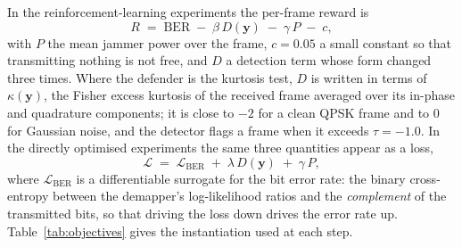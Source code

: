 In the reinforcement-learning experiments the per-frame reward is
\begin{equation}
R \;=\; \mathrm{BER} \;-\; \beta \, D(\mathbf{y}) \;-\; \gamma \, P \;-\; c ,
\label{eq:reward}
\end{equation}
with $P$ the mean jammer power over the frame, $c = 0.05$ a small constant so that transmitting
nothing is not free, and $D$ a detection term whose form changed three times.
Where the defender is the kurtosis test, $D$ is written in terms of $\kappa(\mathbf{y})$, the Fisher
excess kurtosis of the received frame averaged over its in-phase and quadrature components; it is
close to $-2$ for a clean QPSK frame and to $0$ for Gaussian noise, and the detector flags a frame
when it exceeds $\tau = -1.0$.
In the directly optimised experiments the same three quantities appear as a loss,
\begin{equation}
\mathcal{L} \;=\; \mathcal{L}_{\mathrm{BER}} \;+\; \lambda \, D(\mathbf{y}) \;+\; \gamma \, P ,
\label{eq:loss}
\end{equation}
where $\mathcal{L}_{\mathrm{BER}}$ is a differentiable surrogate for the bit error rate: the binary
cross-entropy between the demapper's log-likelihood ratios and the \emph{complement} of the
transmitted bits, so that driving the loss down drives the error rate up.
Table~\ref{tab:objectives} gives the instantiation used at each step.


